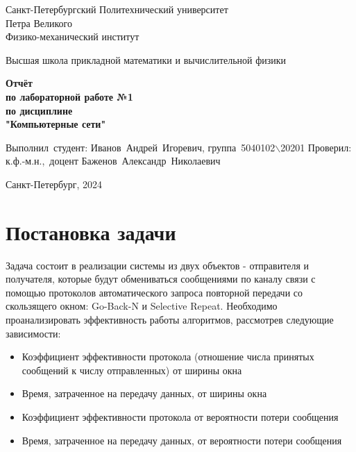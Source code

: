 \documentclass[12pt,a4paper]{article}
\begin{document}
	
	\begin{titlepage}
		
		\begin{center}
			\begin{large}
				Санкт-Петербургский Политехнический университет\\ Петра Великого\\
				Физико-механический институт\\
			\end{large}
			\vspace{0.2cm}
			Высшая школа прикладной математики и вычислительной физики\\
			
		\end{center}
		
		\vspace{3cm}
		\begin{center}
			\textbf{Отчёт\\ по лабораторной работе №1\\ по дисциплине\\ "Компьютерные сети"}
		\end{center}
		
		\vspace{3cm}
		
		\vbox{%
			\hfill%
			\vbox{%
				\hbox{Выполнил студент:}%
				\hbox{\break}
				\hbox{Иванов Андрей Игоревич,}%
				\hbox{группа 5040102$\backslash$20201}%
				\hbox{\break}
				\hbox{\break}
				\hbox{Проверил:}
				\hbox{\break}
				\hbox{к.ф.-м.н., доцент}
				\hbox{Баженов Александр Николаевич}
			}%
		} 
		\vfill
		
		\begin{center}
			Санкт-Петербург, 2024
		\end{center}
	
	\end{titlepage}
	\tableofcontents
	\newpage
	
	\listoffigures
	\newpage
	
	\section{Постановка задачи}
            Задача состоит в реализации системы из двух объектов - отправителя и получателя, которые будут обмениваться сообщениями по каналу связи с помощью протоколов автоматического запроса повторной передачи со скользящего окном: Go-Back-N и Selective Repeat.
            Необходимо проанализировать эффективность работы алгоритмов, рассмотрев следующие зависимости:
            \begin{itemize}
                \item Коэффициент эффективности протокола (отношение числа принятых сообщений к числу отправленных) от ширины окна
                \item Время, затраченное на передачу данных, от ширины окна
                \item Коэффициент эффективности протокола от вероятности потери сообщения
                \item Время, затраченное на передачу данных, от вероятности потери сообщения
            \end{itemize}
        
\end{document}
